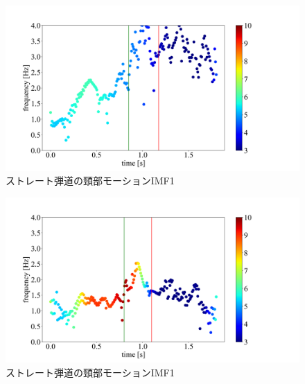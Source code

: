 
\begin{figure}
    \centering
    \includegraphics[width=1.0\linewidth]{./images/straight_data/neck/IMF4.png}
    \caption{ストレート弾道の頸部モーションIMF1}
    \label{straight neck imf4}
\end{figure}

\begin{figure}
    \centering
    \includegraphics[width=1.0\linewidth]{./images/headup_data/neck/IMF4.png}
    \caption{ストレート弾道の頸部モーションIMF1}
    \label{headup neck imf4}
\end{figure}

